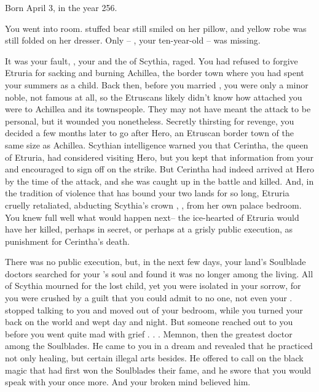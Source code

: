 \documentclass[char]{Kos}
\begin{document}
\name{\cScythiaQueen{}}

Born April 3, in the year 256.

You went into \cFugitive{\their} room. \cFugitive{\Their} stuffed bear still smiled on her pillow, and \cFugitive{\their} yellow robe was still folded on her dresser. Only \cFugitive{\they}-- \cFugitive{}, your ten-year-old  \cFugitive{\offspring}-- was missing.

It was your fault, \cScythiaKing{}, your \cScythiaKing{\spouse} and the \cScythiaKing{\monarch} of Scythia, raged. You had refused to forgive Etruria for sacking and burning Achillea, the border town where you had spent your summers as a child. Back then, before you married \cScythiaKing{}, you were only a minor noble, not famous at all, so the Etruscans likely didn't know how attached you were to Achillea and its townspeople. They may not have meant the attack to be personal, but it wounded you nonetheless. Secretly thirsting for revenge, you decided a few months later to go after Hero, an Etruscan border town of the same size as Achillea. Scythian intelligence warned you that Cerintha, the queen of Etruria, had considered visiting Hero, but you kept that information from your \cScythiaKing{\spouse} and encouraged \cScythiaKing{\them} to sign off on the strike. But Cerintha had indeed arrived at Hero by the time of the attack, and she was caught up in the battle and killed. And, in the tradition of violence that has bound your two lands for so long, Etruria cruelly retaliated, abducting Scythia's crown \cFugitive{\prince}, \cFugitive{\realname}, from her own palace bedroom. You knew full well what would happen next-- the ice-hearted \cEtruriaKing{\Monarch} of Etruria would have her killed, perhaps in secret, or perhaps at a grisly public execution, as punishment for Cerintha's death.

There was no public execution, but, in the next few days, your land's Soulblade doctors searched for your \cFugitive{\offspring}'s soul and found it was no longer among the living. All of Scythia mourned for the lost child, yet you were isolated in your sorrow, for you were crushed by a guilt that you could admit to no one, not even your \cScythiaKing{\spouse}.  stopped talking to you and moved out of your bedroom, while you turned your back on the world and wept day and night. But someone reached out to you before you went quite mad with grief . . . Memnon, then the greatest doctor among the Soulblades. He came to you in a dream and revealed that he practiced not only healing, but certain illegal arts besides. He offered to call on the black magic that had first won the Soulblades their fame, and he swore that you would speak with your \cFugitive{\offspring} once more. And your broken mind believed him.
\end{document}

